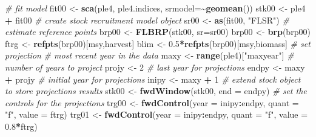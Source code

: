 \documentclass[
]{book}
\newenvironment{Shaded}{\begin{snugshade}}{\end{snugshade}}
\newcommand{\AttributeTok}[1]{\textcolor[rgb]{0.13,0.29,0.53}{#1}}
\newcommand{\CommentTok}[1]{\textcolor[rgb]{0.56,0.35,0.01}{\textit{#1}}}
\newcommand{\DecValTok}[1]{\textcolor[rgb]{0.00,0.00,0.81}{#1}}
\newcommand{\FloatTok}[1]{\textcolor[rgb]{0.00,0.00,0.81}{#1}}
\newcommand{\FunctionTok}[1]{\textcolor[rgb]{0.13,0.29,0.53}{\textbf{#1}}}
\newcommand{\NormalTok}[1]{#1}
\newcommand{\OtherTok}[1]{\textcolor[rgb]{0.56,0.35,0.01}{#1}}
\newcommand{\SpecialCharTok}[1]{\textcolor[rgb]{0.81,0.36,0.00}{\textbf{#1}}}
\newcommand{\StringTok}[1]{\textcolor[rgb]{0.31,0.60,0.02}{#1}}
\begin{document}
\begin{Shaded}
\begin{Highlighting}[]
\CommentTok{\# fit model}
\NormalTok{fit00 }\OtherTok{\textless{}{-}} \FunctionTok{sca}\NormalTok{(ple4, ple4.indices, }\AttributeTok{srmodel=}\SpecialCharTok{\textasciitilde{}}\FunctionTok{geomean}\NormalTok{())}
\NormalTok{stk00 }\OtherTok{\textless{}{-}}\NormalTok{ ple4 }\SpecialCharTok{+}\NormalTok{ fit00}
\CommentTok{\# create stock recruitment model object}
\NormalTok{sr00 }\OtherTok{\textless{}{-}} \FunctionTok{as}\NormalTok{(fit00, }\StringTok{"FLSR"}\NormalTok{)}
\CommentTok{\# estimate reference points}
\NormalTok{brp00 }\OtherTok{\textless{}{-}} \FunctionTok{FLBRP}\NormalTok{(stk00, }\AttributeTok{sr=}\NormalTok{sr00)}
\NormalTok{brp00 }\OtherTok{\textless{}{-}} \FunctionTok{brp}\NormalTok{(brp00)}
\NormalTok{ftrg }\OtherTok{\textless{}{-}} \FunctionTok{refpts}\NormalTok{(brp00)[}\StringTok{\textquotesingle{}msy\textquotesingle{}}\NormalTok{,}\StringTok{\textquotesingle{}harvest\textquotesingle{}}\NormalTok{]}
\NormalTok{blim }\OtherTok{\textless{}{-}} \FloatTok{0.5}\SpecialCharTok{*}\FunctionTok{refpts}\NormalTok{(brp00)[}\StringTok{\textquotesingle{}msy\textquotesingle{}}\NormalTok{,}\StringTok{\textquotesingle{}biomass\textquotesingle{}}\NormalTok{]}
\CommentTok{\# set projection}
\CommentTok{\# most recent year in the data}
\NormalTok{maxy }\OtherTok{\textless{}{-}} \FunctionTok{range}\NormalTok{(ple4)[}\StringTok{"maxyear"}\NormalTok{]}
\CommentTok{\# number of years to project}
\NormalTok{projy }\OtherTok{\textless{}{-}} \DecValTok{2}
\CommentTok{\# last year for projections}
\NormalTok{endpy }\OtherTok{\textless{}{-}}\NormalTok{ maxy }\SpecialCharTok{+}\NormalTok{ projy}
\CommentTok{\# initial year for projections}
\NormalTok{inipy }\OtherTok{\textless{}{-}}\NormalTok{ maxy }\SpecialCharTok{+} \DecValTok{1}
\CommentTok{\# extend stock object to store projection\textquotesingle{}s results}
\NormalTok{stk00 }\OtherTok{\textless{}{-}} \FunctionTok{fwdWindow}\NormalTok{(stk00, }\AttributeTok{end =}\NormalTok{ endpy)}
\CommentTok{\# set the controls for the projections}
\NormalTok{trg00 }\OtherTok{\textless{}{-}} \FunctionTok{fwdControl}\NormalTok{(}\AttributeTok{year =}\NormalTok{ inipy}\SpecialCharTok{:}\NormalTok{endpy, }\AttributeTok{quant =} \StringTok{"f"}\NormalTok{, }\AttributeTok{value =}\NormalTok{ ftrg)}
\NormalTok{trg01 }\OtherTok{\textless{}{-}} \FunctionTok{fwdControl}\NormalTok{(}\AttributeTok{year =}\NormalTok{ inipy}\SpecialCharTok{:}\NormalTok{endpy, }\AttributeTok{quant =} \StringTok{"f"}\NormalTok{, }\AttributeTok{value =} \FloatTok{0.8}\SpecialCharTok{*}\NormalTok{ftrg)}

\end{Highlighting}
\end{Shaded}
\end{document}
